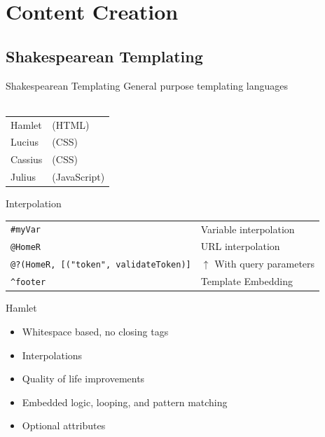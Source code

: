 \documentclass[pdf]{beamer}
\begin{document}
\section{Content Creation}
\subsection{Shakespearean Templating}

\begin{frame}{Shakespearean Templating}
  General purpose templating languages\\
  \\
  \begin{tabular}{ l l }
    Hamlet  & (HTML)\\
    Lucius  & (CSS)\\
    Cassius & (CSS)\\
    Julius  & (JavaScript)\\
  \end{tabular}
\end{frame}

\begin{frame}[fragile]{Interpolation}
  \begin{tabular} { l l }
    \texttt{#{myVar}}                               & Variable interpolation \\
    \pause
    \texttt{@{HomeR}}                               & URL interpolation \\
    \pause
    \texttt{@?{(HomeR, [("token", validateToken)]}} & $\uparrow$ With query parameters \\
    \pause
    \texttt{^{footer}}                              & Template Embedding\\
  \end{tabular}
\end{frame}

\begin{frame}{Hamlet}
  \begin{itemize}
  \item<1-> Whitespace based, no closing tags\\
  \item<2-> Interpolations\\
  \item<3-> Quality of life improvements\\
  \item<4-> Embedded logic, looping, and pattern matching \\
  \item<5-> Optional attributes\\
  \end{itemize}
\end{frame}
\end{document}
